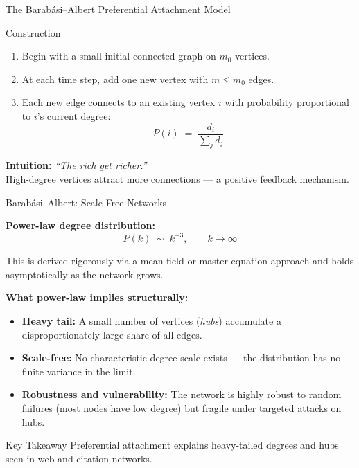 \documentclass[t]{beamer}
\begin{document}
\begin{frame}{The Barab\'{a}si--Albert Preferential Attachment Model}

\begin{block}{Construction}
  \begin{enumerate}
    \item Begin with a small initial connected graph on $m_0$ vertices.
    \item At each time step, add one new vertex with $m \leq m_0$ edges.
    \item Each new edge connects to an existing vertex $i$ with probability
          proportional to $i$'s current degree:
          \[
            P(i) \;=\; \frac{d_i}{\displaystyle\sum_{j} d_j}
          \]
  \end{enumerate}
\end{block}

\medskip

\textbf{Intuition:} \emph{``The rich get richer.''} \\
High-degree vertices attract more connections — a positive feedback mechanism.

\end{frame}


\begin{frame}{Barab\'{a}si--Albert: Scale-Free Networks}
\footnotesize

\textbf{Power-law degree distribution:}
\[
  P(k) \;\sim\; k^{-3}, \qquad k \to \infty
\]

This is derived rigorously via a mean-field or master-equation approach and holds
asymptotically as the network grows.

\smallskip

\textbf{What power-law implies structurally:}
\begin{itemize}
  \item \textbf{Heavy tail:} A small number of vertices (\emph{hubs}) accumulate
        a disproportionately large share of all edges.
  \item \textbf{Scale-free:} No characteristic degree scale exists —
        the distribution has no finite variance in the limit.
  \item \textbf{Robustness and vulnerability:} The network is highly robust
        to random failures (most nodes have low degree) but fragile under
        targeted attacks on hubs.
\end{itemize}

\begin{alertblock}{Key Takeaway}
  Preferential attachment explains heavy-tailed degrees and hubs seen in
  web and citation networks.
\end{alertblock}

\end{frame}
\end{document}
